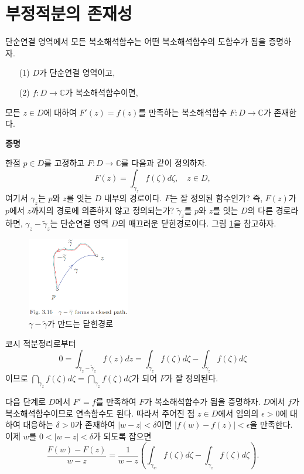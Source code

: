 \section{부정적분의 존재성}

단순연결 영역에서 모든 복소해석함수는 어떤 복소해석함수의 도함수가 됨을 증명하자.

\begin{salttheorem} {}{} \label{thm-3-5}

\begin{itemize}
\item[(1)] $D$가 단순연결 영역이고,
\item[(2)] $f:D\to\mathbb C$가 복소해석함수이면,
\end{itemize}
모든 $z\in D$에 대하여 $F'(z) = f(z)$를 만족하는 
복소해석함수 $F:D\to\mathbb C$가 존재한다.
\end{salttheorem}

{\bf 증명}

한점 $p\in D$를 고정하고 $F:D\to\mathbb C$를 다음과 같이 정의하자.
\[
F(z) = \int_{\gamma_z} f(\zeta)d\zeta, \quad z\in D,
\]
여기서 $\gamma_z$는 $p$와 $z$를 잇는 $D$ 내부의 경로이다.
$F$는 잘 정의된 함수인가? 즉, $F(z)$가 $p$에서 $z$까지의 경로에
의존하지 않고 정의되는가?
$\tilde \gamma_z$를 $p$와 $z$를 잇는 $D$의 다른 경로라 하면,
$\gamma_z - \tilde\gamma_z$는 단순연결 영역 $D$의
매끄러운 닫힌경로이다. 그림 \ref{fig-3-16}을 참고하자.

\begin{figure}[!h]
\begin{center}
\includegraphics[width=0.4\textwidth]{./SaltChapter/fig-3-16}
\end{center}
\caption{$\gamma - \tilde \gamma$가 만드는 닫힌경로}
\label{fig-3-16}
\end{figure}

코시 적분정리로부터 
\[
0 = \int_{\gamma_z - \tilde\gamma_z}f(z)dz 
= \int_{\gamma_z} f(\zeta)d\zeta 
- \int_{\tilde\gamma_z} f(\zeta)d\zeta 
\]
이므로 $\dint_{\gamma_z}f(\zeta)d\zeta = \dint_{\tilde\gamma_z} f(\zeta)d\zeta$가 되어 
$F$가 잘 정의된다.

다음 단계로 $D$에서 $F'=f$를 만족하여 $F$가 복소해석함수가 됨을 증명하자.
$D$에서 $f$가 복소해석함수이므로
연속함수도 된다. 
따라서 주어진 점 $z\in D$에서 임의의 $\epsilon>0$에 대하여
대응하는 $\delta>0$가 존재하여
$|w-z|<\delta$이면 $|f(w)-f(z)|<\epsilon$을 만족한다.
이제 $w$를 $0<|w-z|<\delta$가 되도록 잡으면
\[
\dfrac{F(w)-F(z)}{w-z} = \dfrac1{w-z} \left(
\int_{\gamma_w} f(\zeta)d\zeta - \int_{\gamma_z} f(\zeta)d\zeta \right).
\]

